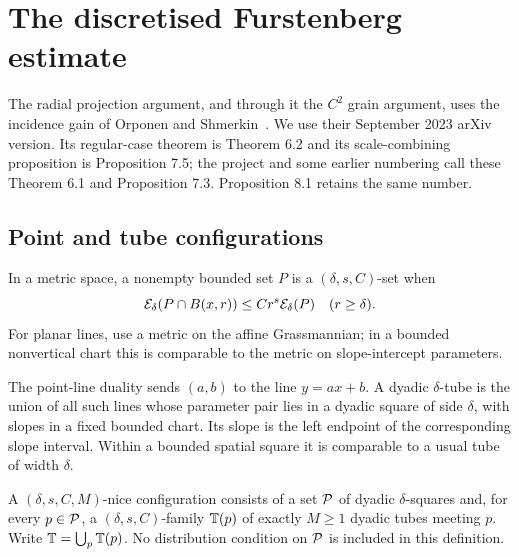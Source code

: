 \chapter{The discretised Furstenberg estimate}
\label{chap:furstenberg}

The radial projection argument, and through it the $C^2$ grain
argument, uses the incidence gain of Orponen and Shmerkin~\cite{OS}.
We use their September 2023 arXiv version. Its regular-case theorem
is Theorem 6.2 and its scale-combining proposition is Proposition 7.5;
the project and some earlier numbering call these Theorem 6.1 and
Proposition 7.3. Proposition 8.1 retains the same number.

\section{Point and tube configurations}

\begin{definition}
\label{def:os-set}
In a metric space, a nonempty bounded set $P$ is a
$(\delta,s,C)$-set when
\[
    \mathcal{E}_\delta(P\cap B(x,r))\leq Cr^s\mathcal{E}_\delta(P)
    \quad(r\geq\delta).
\]
For planar lines, use a metric on the affine Grassmannian; in a
bounded nonvertical chart this is comparable to the metric on
slope-intercept parameters.
\end{definition}

\begin{definition}
\label{def:dyadic-tube}
The point-line duality sends $(a,b)$ to the line $y=ax+b$.
A dyadic $\delta$-tube is the union of all such lines whose parameter
pair lies in a dyadic square of side $\delta$, with slopes in a
fixed bounded chart. Its slope is the left endpoint of the
corresponding slope interval. Within a bounded spatial square it
is comparable to a usual tube of width $\delta$.
\end{definition}

\begin{definition}
\label{def:nice-configuration}
A $(\delta,s,C,M)$-nice configuration consists of a set $\mathcal{P}$ of
dyadic $\delta$-squares and, for every $p\in\mathcal{P}$, a
$(\delta,s,C)$-family $\mathbb{T}(p)$ of exactly $M\geq1$ dyadic tubes
meeting $p$. Write $\mathbb{T}=\bigcup_p\mathbb{T}(p)$. No distribution condition
on $\mathcal{P}$ is included in this definition.
\end{definition}

